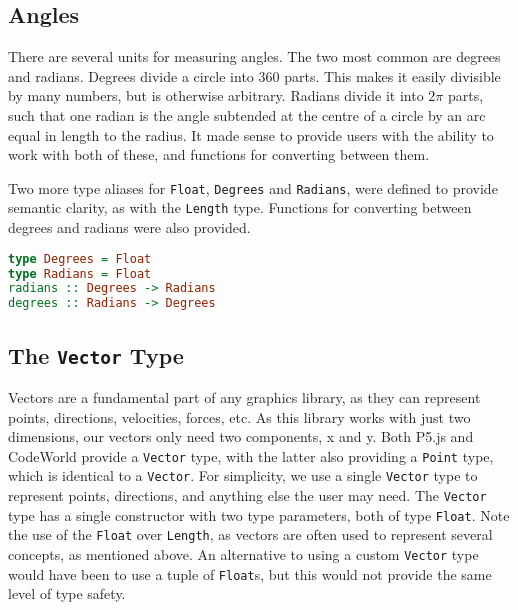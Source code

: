 \documentclass[../main.tex]{subfiles}
\begin{document}
        \subsection{Angles}
            There are several units for measuring angles.
            The two most common are degrees and radians.
            Degrees divide a circle into 360 parts.
            This makes it easily divisible by many numbers, but is otherwise arbitrary.
            Radians divide it into $2\pi$ parts, such that one radian is the angle
                subtended at the centre of a circle by an arc equal in length to the radius.
            It made sense to provide users with the ability to work with both of these, and
                functions for converting between them.

            Two more type aliases for \texttt{Float}, \texttt{Degrees} and
                \texttt{Radians}, were defined to provide semantic clarity, as with the
                \texttt{Length} type.
            Functions for converting between degrees and radians were also provided.

            \begin{lstlisting}[language={Haskell}, label={lst:angleFns}, caption={The angle functions.}]  
type Degrees = Float
type Radians = Float                
radians :: Degrees -> Radians
degrees :: Radians -> Degrees\end{lstlisting}

        \subsection{The \texttt{Vector}
            Type} Vectors are a fundamental part of any graphics library, as they can
                represent points, directions, velocities, forces, etc. As this library works
                with just two dimensions, our vectors only need two components, x and y.
            Both P5.js and CodeWorld provide a \texttt{Vector} type, with the latter also
                providing a \texttt{Point} type, which is identical to a \texttt{Vector}.
            For simplicity, we use a single \texttt{Vector} type to represent points,
                directions, and anything else the user may need.
            The \texttt{Vector} type has a single constructor with two type parameters,
                both of type \texttt{Float}.
            Note the use of the \texttt{Float} over \texttt{Length}, as vectors are often
                used to represent several concepts, as mentioned above.
            An alternative to using a custom \texttt{Vector} type would have been to use a
                tuple of \texttt{Float}s, but this would not provide the same level of type
                safety.
\end{document}
